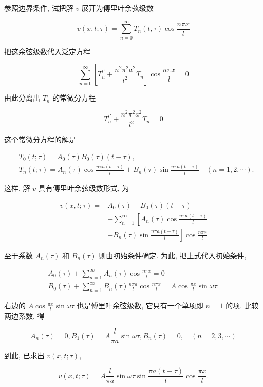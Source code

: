 参照边界条件, 试把解 $v$ 展开为傅里叶余弦级数

$$
v(x, t ; \tau)=\sum_{n=0}^{\infty} T_{n}(t, \tau) \cos \frac{n \pi x}{l}
$$

把这余弦级数代入泛定方程

$$
\sum_{n=0}^{\infty}\left[T_{n}^{\prime \prime}+\frac{n^{2} \pi^{2} a^{2}}{l^{2}} T_{n}\right] \cos \frac{n \pi x}{l}=0
$$

由此分离出 $T_{n}$ 的常微分方程

$$
T_{n}^{\prime \prime}+\frac{n^{2} \pi^{2} a^{2}}{l^{2}} T_{n}=0
$$

这个常微分方程的解是

$$
\begin{aligned}
& T_{0}(t ; \tau)=A_{0}(\tau) B_{0}(\tau)(t-\tau), \\
& T_{n}(t ; \tau)=A_{n}(\tau) \cos \frac{n \pi a(t-\tau)}{l}+B_{n}(\tau) \sin \frac{n \pi a(t-\tau)}{l} \quad(n=1,2, \cdots) .
\end{aligned}
$$

这样, 解 $v$ 具有傅里叶余弦级数形式, 为

$$
\begin{aligned}
v(x, t ; \tau)= & A_{0}(\tau)+B_{0}(\tau)(t-\tau) \\
& +\sum_{n=1}^{\infty}\left[A_{n}(\tau) \cos \frac{n \pi a(t-\tau)}{l}\right. \\
& \left.+B_{n}(\tau) \sin \frac{n \pi a(t-\tau)}{l}\right] \cos \frac{n \pi x}{l}
\end{aligned}
$$

至于系数 $A_{n}(\tau)$ 和 $B_{n}(\tau)$ 则由初始条件确定. 为此, 把上式代入初始条件,

$$
\begin{gathered}
A_{0}(\tau)+\sum_{n=1}^{\infty} A_{n}(\tau) \cos \frac{n \pi x}{l}=0 \\
B_{0}(\tau)+\sum_{n=1}^{\infty} B_{n}(\tau) \frac{n \pi a}{l} \cos \frac{n \pi x}{l}=A \cos \frac{\pi x}{l} \sin \omega \tau .
\end{gathered}
$$

右边的 $A \cos \frac{\pi x}{l} \sin \omega \tau$ 也是傅里叶余弦级数, 它只有一个单项即 $n=1$ 的项. 比较两边系数, 得

$$
A_{n}(\tau)=0, B_{1}(\tau)=A \frac{l}{\pi a} \sin \omega \tau, B_{n}(\tau)=0, \quad(n=2,3, \cdots)
$$

到此, 已求出 $v(x, t ; \tau)$,

$$
v(x, t ; \tau)=A \frac{l}{\pi a} \sin \omega \tau \sin \frac{\pi a(t-\tau)}{l} \cos \frac{\pi x}{l} .
$$

